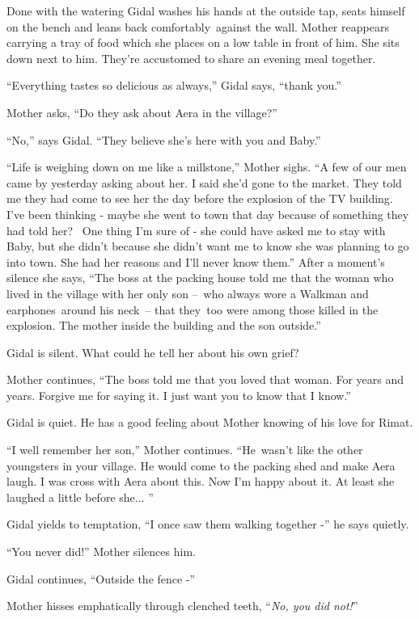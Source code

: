 \documentclass[twoside,11pt]{book}
\begin{document}
Done with the watering Gidal washes his hands at the outside tap, seats himself on the bench and leans back
comfortably~against the wall. Mother reappears carrying a tray of food which she places on a low table in front of him.
She sits down next to him. They're accustomed to share an evening meal together.\ 

``Everything tastes so delicious as always,'' Gidal says, ``thank
you.'' 

Mother asks, ``Do they ask about Aera in the village?'' 

``No,'' says Gidal. ``They believe she's here with you and Baby.''

``Life is weighing down on me like a millstone,'' Mother sighs. ``A few of our
men came by yesterday asking about her. I said she'd gone to the market. They told me they had come to see her the day
before the explosion of the TV building. I've been thinking - maybe she went to town that day because of something they
had told her? ~One thing I'm sure of - she could have asked me to stay with Baby, but she didn't because she didn't
want me to know she was planning to go into town. She had her reasons and I'll never know them.'' After a moment's
silence she says, ``The boss at the packing house told me that the woman who lived in the village with her
only son --\ who always wore a Walkman and earphones\ around his neck\ {}-- that they~too were among those killed in
the explosion. The mother inside the building and the son outside.'' 

Gidal is silent. What could he tell her about his own grief? ~

Mother continues, ``The boss told me that you loved that woman. For years and years. Forgive me for saying
it. I just want you to know that I know.'' 

Gidal is quiet. He has a good feeling about Mother knowing of his love for Rimat. 

``I well remember her son,'' Mother continues. ``He~wasn't like the other
youngsters in your village. He would come to the packing shed and make Aera laugh. I was cross with Aera about this.
Now I'm happy about it. At least she laughed a little before she... '' 

Gidal yields to temptation, ``I once saw them walking together -'' he says quietly.

``You never did!'' Mother silences him.

Gidal continues, ``Outside the fence -'' 

Mother hisses emphatically through clenched teeth, ``\textit{No, you did not!}'' 
\end{document}
